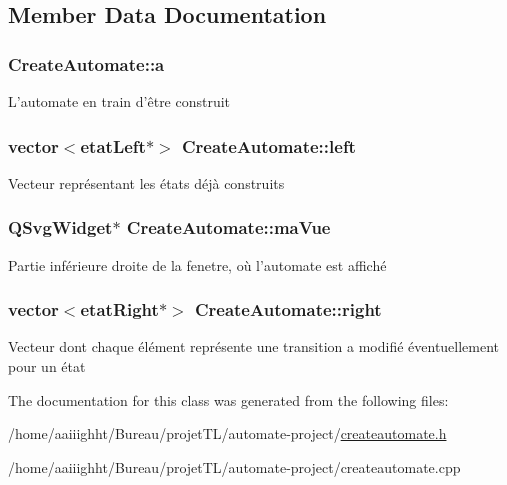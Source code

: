 \subsection{Member Data Documentation}
\hypertarget{class_create_automate_a00809917dbe83828485789bf25725964}{
\subsubsection[{a}]{ Create\-Automate\-::a}}\label{class_create_automate_a00809917dbe83828485789bf25725964}
L'automate en train d'être construit \hypertarget{class_create_automate_a368e5fd06e6bafb6a297cb7d32d90655}{
\subsubsection[{left}]{\setlength{\rightskip}{0pt plus 5cm}vector$<${\bf etat\-Left}$\ast$$>$ Create\-Automate\-::left}}\label{class_create_automate_a368e5fd06e6bafb6a297cb7d32d90655}
Vecteur représentant les états déjà construits \hypertarget{class_create_automate_a67da1a6995daa455a00771c099358a89}{
\subsubsection[{ma\-Vue}]{\setlength{\rightskip}{0pt plus 5cm}Q\-Svg\-Widget$\ast$ Create\-Automate\-::ma\-Vue}}\label{class_create_automate_a67da1a6995daa455a00771c099358a89}
Partie inférieure droite de la fenetre, où l'automate est affiché \hypertarget{class_create_automate_a8471078665ab7f4daf858c81f35496ac}{
\subsubsection[{right}]{\setlength{\rightskip}{0pt plus 5cm}vector$<${\bf etat\-Right}$\ast$$>$ Create\-Automate\-::right}}\label{class_create_automate_a8471078665ab7f4daf858c81f35496ac}
Vecteur dont chaque élément représente une transition a modifié éventuellement pour un état 

The documentation for this class was generated from the following files\-:\begin{DoxyCompactItemize}
\item 
/home/aaiiighht/\-Bureau/projet\-T\-L/automate-\/project/\hyperlink{createautomate_8h}{createautomate.\-h}\item 
/home/aaiiighht/\-Bureau/projet\-T\-L/automate-\/project/createautomate.\-cpp\end{DoxyCompactItemize}
